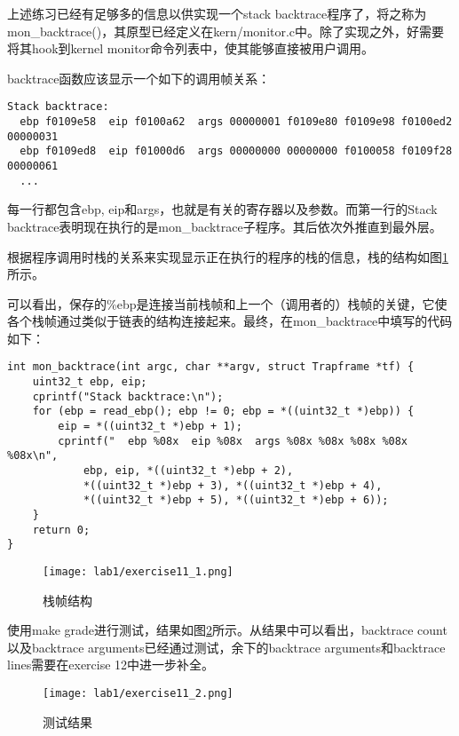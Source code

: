 \par 上述练习已经有足够多的信息以供实现一个stack backtrace程序了，将之称为mon\_backtrace()，其原型已经定义在kern/monitor.c中。除了实现之外，好需要将其hook到kernel monitor命令列表中，使其能够直接被用户调用。
\par backtrace函数应该显示一个如下的调用帧关系：
\begin{lstlisting}[numbers=none]
Stack backtrace:
  ebp f0109e58  eip f0100a62  args 00000001 f0109e80 f0109e98 f0100ed2 00000031
  ebp f0109ed8  eip f01000d6  args 00000000 00000000 f0100058 f0109f28 00000061
  ...
\end{lstlisting}
\par 每一行都包含ebp, eip和args，也就是有关的寄存器以及参数。而第一行的Stack backtrace表明现在执行的是mon\_backtrace子程序。其后依次外推直到最外层。

\begin{exerciseSolution}{11}
    \par 根据程序调用时栈的关系来实现显示正在执行的程序的栈的信息，栈的结构如图\ref{fig:exercise11_1}所示。
    \par 可以看出，保存的\%ebp是连接当前栈帧和上一个（调用者的）栈帧的关键，它使各个栈帧通过类似于链表的结构连接起来。最终，在mon\_backtrace中填写的代码如下：
    \begin{lstlisting}
int mon_backtrace(int argc, char **argv, struct Trapframe *tf) {
    uint32_t ebp, eip;
    cprintf("Stack backtrace:\n");
    for (ebp = read_ebp(); ebp != 0; ebp = *((uint32_t *)ebp)) {
        eip = *((uint32_t *)ebp + 1);
        cprintf("  ebp %08x  eip %08x  args %08x %08x %08x %08x %08x\n",
            ebp, eip, *((uint32_t *)ebp + 2),
            *((uint32_t *)ebp + 3), *((uint32_t *)ebp + 4),
            *((uint32_t *)ebp + 5), *((uint32_t *)ebp + 6));
    }
    return 0;
}
    \end{lstlisting}
    \begin{figure}[htb]
        \centering
        \texttt{[image: lab1/exercise11\_1.png]}
        \caption{栈帧结构}
        \label{fig:exercise11_1}
    \end{figure}

    \par 使用make grade进行测试，结果如图\ref{fig:exercise11_2}所示。从结果中可以看出，backtrace count以及backtrace arguments已经通过测试，余下的backtrace arguments和backtrace lines需要在exercise 12中进一步补全。
    \begin{figure}[htb]
        \centering
        \texttt{[image: lab1/exercise11\_2.png]}
        \caption{测试结果}
        \label{fig:exercise11_2}
    \end{figure}

    \FloatBarrier
\end{exerciseSolution}

